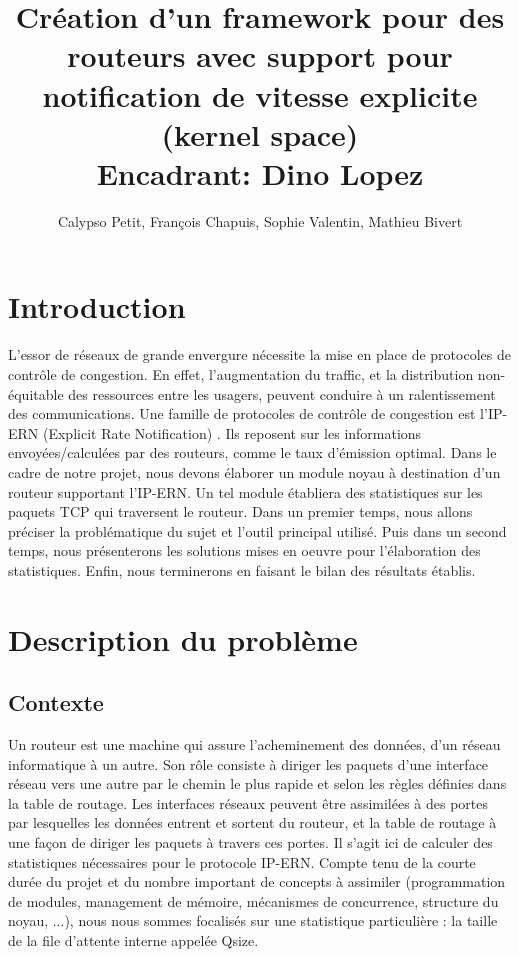 \documentclass[a4paper]{article}
\title{Création d'un framework pour des routeurs
	avec support pour notification de vitesse explicite
	(kernel space)\\Encadrant: Dino Lopez}
\author{Calypso Petit, François Chapuis, Sophie Valentin, Mathieu Bivert}
\begin{document}
\maketitle
\tableofcontents

\section{Introduction}

L'essor de réseaux de grande envergure nécessite la mise en
place de protocoles de contrôle de congestion. En effet,
l'augmentation du traffic, et la distribution non-équitable
des ressources entre les usagers, peuvent conduire à un
ralentissement des communications.
Une famille de protocoles de contrôle de congestion est l'IP-ERN
(Explicit Rate Notification) \cite{thesis1}. Ils reposent sur les informations
envoyées/calculées par des routeurs, comme le taux d'émission
optimal. Dans le cadre de notre projet, nous devons élaborer un
module noyau à destination d'un routeur supportant l'IP-ERN.
Un tel module établiera des statistiques sur les paquets TCP 
qui traversent le routeur. Dans un premier temps, nous allons préciser
la problématique du sujet et l'outil principal utilisé. Puis dans un
second temps, nous présenterons les solutions mises en oeuvre pour 
l'élaboration des statistiques. Enfin, nous terminerons en faisant le
bilan des résultats établis.

\section{Description du problème}
\subsection{Contexte}
Un routeur est une machine qui assure l’acheminement des données,
d'un réseau informatique à un autre. Son rôle consiste à diriger
les paquets d'une interface réseau vers une autre par le chemin
le plus rapide et selon les règles définies dans la table de
routage. 
Les interfaces réseaux peuvent être assimilées à des
portes par lesquelles les données entrent et sortent du routeur, et
la table de routage à une façon de diriger les paquets à travers
ces portes. 
Il s'agit ici de calculer des statistiques nécessaires 
pour le protocole IP-ERN. Compte tenu de la courte durée du projet et 
du nombre important de concepts à assimiler (programmation de modules,
management de mémoire, mécanismes de concurrence, structure du noyau, ...),
nous nous sommes focalisés sur une statistique particulière : la taille
de la file d'attente interne appelée Qsize.
\end{document}
